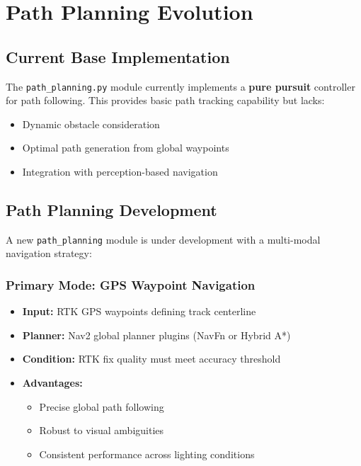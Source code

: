 \section{Path Planning Evolution}

\subsection{Current Base Implementation}
The \texttt{path\_planning.py} module currently implements a \textbf{pure pursuit} controller for path following. This provides basic path tracking capability but lacks:
\begin{itemize}
    \item Dynamic obstacle consideration
    \item Optimal path generation from global waypoints
    \item Integration with perception-based navigation
\end{itemize}

\subsection{Path Planning  Development}
A new \texttt{path\_planning} module is under development with a multi-modal navigation strategy:

\subsubsection{Primary Mode: GPS Waypoint Navigation}
\begin{itemize}
    \item \textbf{Input:} RTK GPS waypoints defining track centerline
    \item \textbf{Planner:} Nav2 global planner plugins (NavFn or Hybrid A*)
    \item \textbf{Condition:} RTK fix quality must meet accuracy threshold
    \item \textbf{Advantages:}
    \begin{itemize}
        \item Precise global path following
        \item Robust to visual ambiguities
        \item Consistent performance across lighting conditions
    \end{itemize}
\end{itemize}

